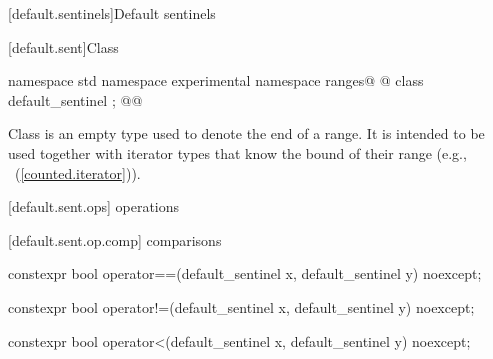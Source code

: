 \begin{addedblock}
[default.sentinels]{Default sentinels}

[default.sent]{Class }

%
\begin{itemdecl}
namespace std { namespace experimental { namespace ranges@ @ {
  class default_sentinel { };
}}}@\newtxt{\}}@
\end{itemdecl}

\pnum
Class  is an empty type used to denote the end of a
range. It is intended to be used together with iterator types that know the bound
of their range (e.g., ~(\ref{counted.iterator})).

[default.sent.ops]{ operations}

[default.sent.op.comp]{ comparisons}

%
%
\begin{itemdecl}
constexpr bool operator==(default_sentinel x, default_sentinel y) noexcept;
\end{itemdecl}

\begin{itemdescr}
\pnum
\returns {}
\end{itemdescr}

%
%
\begin{itemdecl}
constexpr bool operator!=(default_sentinel x, default_sentinel y) noexcept;
\end{itemdecl}

\begin{itemdescr}
\pnum
\returns {}
\end{itemdescr}

%
%
\begin{itemdecl}
constexpr bool operator<(default_sentinel x, default_sentinel y) noexcept;
\end{itemdecl}

\begin{itemdescr}
\pnum
\returns {}
\end{itemdescr}


\end{addedblock}
